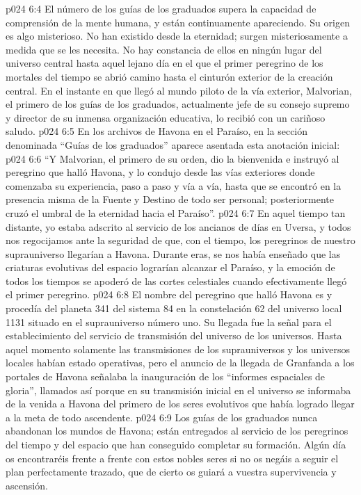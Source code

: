 \vs p024 6:4 \pc El número de los guías de los graduados supera la capacidad de comprensión de la mente humana, y están continuamente apareciendo. Su origen es algo misterioso. No han existido desde la eternidad; surgen misteriosamente a medida que se les necesita. No hay constancia de ellos en ningún lugar del universo central hasta aquel lejano día en el que el primer peregrino de los mortales del tiempo se abrió camino hasta el cinturón exterior de la creación central. En el instante en que llegó al mundo piloto de la vía exterior, Malvorian, el primero de los guías de los graduados, actualmente jefe de su consejo supremo y director de su inmensa organización educativa, lo recibió con un cariñoso saludo.
\vs p024 6:5 En los archivos de Havona en el Paraíso, en la sección denominada “Guías de los graduados” aparece asentada esta anotación inicial:
\vs p024 6:6 “Y Malvorian, el primero de su orden, dio la bienvenida e instruyó al peregrino que halló Havona, y lo condujo desde las vías exteriores donde comenzaba su experiencia, paso a paso y vía a vía, hasta que se encontró en la presencia misma de la Fuente y Destino de todo ser personal; posteriormente cruzó el umbral de la eternidad hacia el Paraíso”.
\vs p024 6:7 En aquel tiempo tan distante, yo estaba adscrito al servicio de los ancianos de días en Uversa, y todos nos regocijamos ante la seguridad de que, con el tiempo, los peregrinos de nuestro suprauniverso llegarían a Havona. Durante eras, se nos había enseñado que las criaturas evolutivas del espacio lograrían alcanzar el Paraíso, y la emoción de todos los tiempos se apoderó de las cortes celestiales cuando efectivamente llegó el primer peregrino.
\vs p024 6:8 \pc El nombre del peregrino que halló Havona es  y procedía del planeta 341 del sistema 84 en la constelación 62 del universo local 1131 situado en el suprauniverso número uno. Su llegada fue la señal para el establecimiento del servicio de transmisión del universo de los universos. Hasta aquel momento solamente las transmisiones de los suprauniversos y los universos locales habían estado operativas, pero el anuncio de la llegada de Granfanda a los portales de Havona señalaba la inauguración de los “informes espaciales de gloria”, llamados así porque en su transmisión inicial en el universo se informaba de la venida a Havona del primero de los seres evolutivos que había logrado llegar a la meta de todo ascendente.
\vs p024 6:9 \pc Los guías de los graduados nunca abandonan los mundos de Havona; están entregados al servicio de los peregrinos del tiempo y del espacio que han conseguido completar su formación. Algún día os encontraréis frente a frente con estos nobles seres si no os negáis a seguir el plan perfectamente trazado, que de cierto os guiará a vuestra supervivencia y ascensión.

